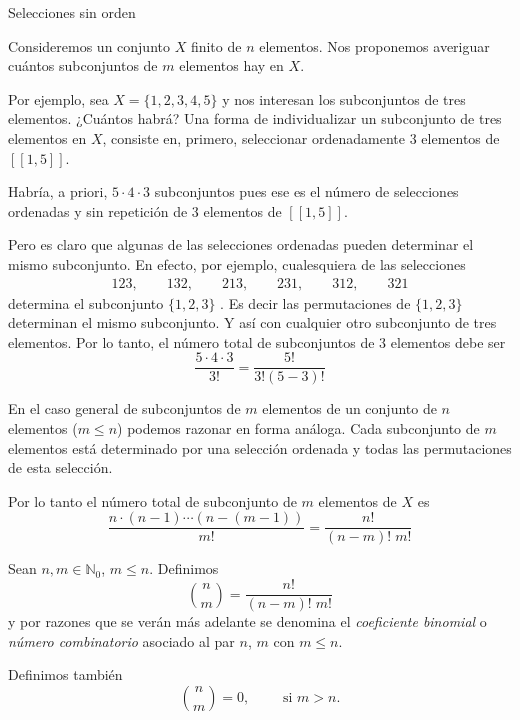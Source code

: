 \begin{section}{Selecciones sin orden}




Consideremos un conjunto $X$ finito de $n$ elementos.
Nos proponemos averiguar cuántos subconjuntos de $m$ elementos
hay en $X$.

\begin{ejemplo}
Por ejemplo, sea $X = \{ 1, 2, 3, 4, 5 \}$ y nos interesan los
subconjuntos de tres ele\-men\-tos. ¿Cuántos habrá? Una forma
de individualizar un subconjunto de tres elementos en $X$, consiste
en, primero, seleccionar  ordenadamente $3$ elementos de $[[ 1 , 5 ]]$.

Habría, a priori, $5 \cdot 4 \cdot 3$ subconjuntos pues ese es el número
de selecciones ordenadas y sin repetición de $3$ elementos de $[[ 1 , 5 ]]$.

Pero es claro que algunas de las selecciones ordenadas pueden determinar el mismo subconjunto. En efecto, por ejemplo, cualesquiera de las selecciones
\begin{align*}
1 2 3, \qquad  1 3 2, \qquad  2 1 3, \qquad 2 3 1, \qquad  3 1 2, \qquad  3 2 1
\end{align*}
determina el subconjunto $\{ 1, 2, 3\}$ . Es decir las permutaciones de $\{ 1, 2, 3\}$ determinan el mismo subconjunto.  Y así con cualquier otro
subconjunto de tres elementos. Por lo tanto, el número total de
subconjuntos de $3$ elementos debe ser
$$
\frac{5 \cdot 4 \cdot 3}{3!} =  \frac{5!}{3! (5 - 3)!}
$$
\end{ejemplo}


En el caso general de subconjuntos de $m$ elementos de un
conjunto de $n$ elementos ($m \le n$) podemos razonar en forma análoga. Cada
subconjunto de $m$ elementos está determinado por una selección ordenada y todas las permutaciones de esta selección.

Por lo tanto el número total de subconjunto de $m$ elementos
de $X$ es
$$
\frac{n \cdot (n - 1) \cdots (n - (m - 1))}{m!} = \frac{n!}{(n - m)!\; m!}
$$

\begin{definicion}
Sean $n, m \in \mathbb N_0$, $m \le n$. Definimos
$$
\binom{n}{m} = \frac{n!}{(n - m)! \; m!}
$$
y por razones que se verán más adelante se denomina el {\em coeficiente binomial} o {\em número combinatorio} asociado al par $n$, $m$ con $m \le n$.


Definimos también
$$
\binom{n}{m} = 0,\qquad \text{ si } m > n.
$$
\end{definicion}


\end{section}

